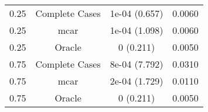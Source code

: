 \begin{table}[ht]
\centering
\begin{tabular}{cccc}
  \hline
  \hline
0.25 & Complete Cases & 1e-04 (0.657) & 0.0060 \\ 
  0.25 & mcar & 1e-04 (1.098) & 0.0060 \\ 
  0.25 & Oracle & 0 (0.211) & 0.0050 \\ 
  0.75 & Complete Cases & 8e-04 (7.792) & 0.0310 \\ 
  0.75 & mcar & 2e-04 (1.729) & 0.0110 \\ 
  0.75 & Oracle & 0 (0.211) & 0.0050 \\ 
   \hline
\end{tabular}
\end{table}
